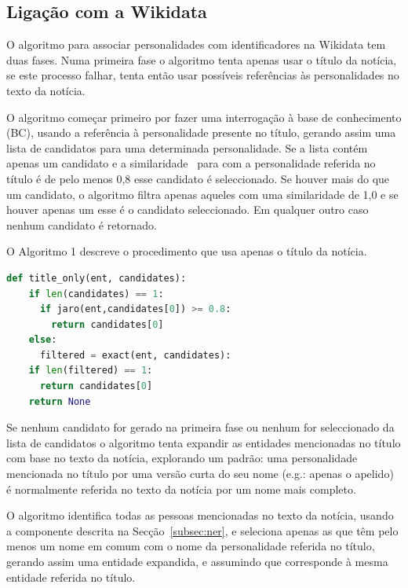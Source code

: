 \documentclass[a4paper, twocolumn, 11pt, twoside]{article}
\begin{document}
\subsection{Ligação com a Wikidata}
\label{subsec:ent_linking}

O algoritmo para associar personalidades com identificadores na Wikidata tem duas fases. Numa primeira fase o algoritmo tenta apenas usar o título da notícia, se este processo falhar, tenta então usar possíveis referências às personalidades no texto da notícia.

O algoritmo começar primeiro por fazer uma interrogação à base de conhecimento (BC), usando a referência à personalidade presente no título, gerando assim uma lista de candidatos para uma determinada personalidade. Se a lista contém apenas um candidato e a similaridade~\citep{jaro1989} para com a personalidade referida no título é de pelo menos 0,8 esse candidato é seleccionado. Se houver mais do que um candidato, o algoritmo filtra apenas aqueles com uma similaridade de 1,0 e se houver apenas um esse é o candidato seleccionado. Em qualquer outro caso nenhum candidato é retornado. 

O Algoritmo 1 descreve o procedimento que usa apenas o título da notícia.

\begin{lstlisting}[language=python,columns=fullflexible,frame=single,label={lst:alg1},title={Algoritmo 1. Ligação com a Wikidata usando apenas o título.},captionpos=b]
def title_only(ent, candidates):
    if len(candidates) == 1:
      if jaro(ent,candidates[0]) >= 0.8:
        return candidates[0]
    else:
      filtered = exact(ent, candidates):
	if len(filtered) == 1:
	  return candidates[0]
    return None
\end{lstlisting}

Se nenhum candidato for gerado na primeira fase ou nenhum for seleccionado da lista de candidatos o algoritmo tenta expandir as entidades mencionadas no título com base no texto da notícia, explorando um padrão: uma personalidade mencionada no título por uma versão curta do seu nome (e.g.: apenas o apelido) é normalmente referida no texto da notícia por um nome mais completo.

O algoritmo identifica todas as pessoas mencionadas no texto da notícia, usando a componente descrita na Secção~\ref{subsec:ner}, e seleciona apenas as que têm pelo menos um nome em comum com o nome da personalidade referida no título, gerando assim uma entidade expandida, e assumindo que corresponde à mesma entidade referida no título.
\end{document}
